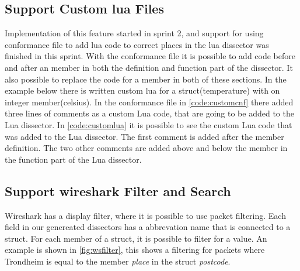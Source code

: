 

\subsection{Support Custom \Gls{lua} Files}
Implementation of this feature started in sprint 2, and support for using 
conformance file to add lua code to correct places in the lua dissector was 
finished in this sprint. With the conformance file it is possible to add code 
before and after an member in both the definition and function part of the 
dissector. It also possible to replace the code for a member in both of these 
sections. In the example below there is written custom lua for a 
struct(temperature) with on integer member(celsius). In the conformance file 
in \autoref{code:customcnf} there added three lines of comments as a custom 
Lua code, that are going to be added to the Lua dissector. In 
\autoref{code:customlua} it is possible to see the custom Lua code that was 
added to the Lua dissector. The first comment is added after the member 
definition. The two other comments are added above and below the member in the 
function part of the Lua dissector.





\subsection{Support \Gls{wireshark} Filter and Search}
Wireshark has a display filter, where it is possible to use packet filtering. 
Each field in our genereated dissectors has a abbrevation name that is 
connected to a struct. For each member of a struct, it is possible to filter 
for a value. An example is shown in \autoref{fig:wsfilter}, this shows a 
filtering for packets where Trondheim is equal to the member \emph{place} in 
the struct \emph{postcode}. 

